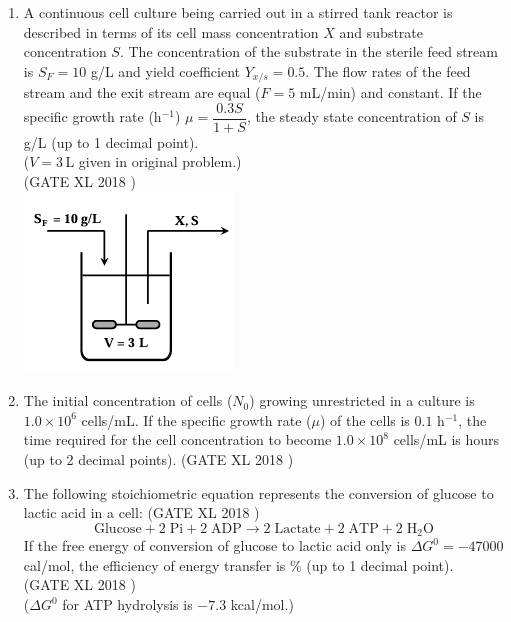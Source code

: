 \documentclass[14pt]{extarticle}
\begin{document}
\begin{flushleft}
\begin{enumerate}
\item A continuous cell culture being carried out in a stirred tank reactor is described in terms of its cell mass concentration $X$ and substrate concentration $S$. The concentration of the substrate in the sterile feed stream is $S_F = 10$ g/L and yield coefficient $Y_{x/s} = 0.5$. The flow rates of the feed stream and the exit stream are equal ($F = 5$ mL/min) and constant. If the specific growth rate (h$^{-1}$) $\mu = \dfrac{0.3 S}{1+S}$, the steady state concentration of $S$ is \underline{\hspace{3cm}} g/L (up to 1 decimal point).\\
($V = 3\,$L given in original problem.)\\
\hfill(GATE XL 2018 )\\
\includegraphics[scale=0.7]{fig22.png}

\item The initial concentration of cells ($N_0$) growing unrestricted in a culture is $1.0\times10^{6}$ cells/mL. If the specific growth rate ($\mu$) of the cells is $0.1$ h$^{-1}$, the time required for the cell concentration to become $1.0\times10^{8}$ cells/mL is \underline{\hspace{3cm}} hours (up to 2 decimal points).
\hfill(GATE XL 2018 )\\

\item The following stoichiometric equation represents the conversion of glucose to lactic acid in a cell:
\hfill(GATE XL 2018 )\\
\[
\text{Glucose} + 2\;\text{Pi} + 2\;\text{ADP} \longrightarrow 2\;\text{Lactate} + 2\;\text{ATP} + 2\;\text{H}_2\text{O}
\]
If the free energy of conversion of glucose to lactic acid only is $\Delta G^0 = -47000$ cal/mol, the efficiency of energy transfer is \underline{\hspace{2.5cm}} \% (up to 1 decimal point).\\
\hfill(GATE XL 2018 )\\
($\Delta G^0$ for ATP hydrolysis is $-7.3$ kcal/mol.)


\end{enumerate}
\end{flushleft}
\end{document}
